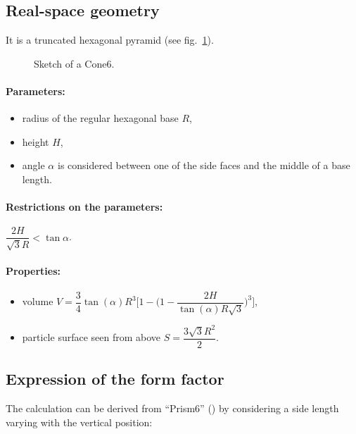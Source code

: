 \subsection{Real-space geometry}
It is a truncated hexagonal pyramid (see fig.~\ref{cone6}). 

\begin{figure}[ht]
\begin{center}
\caption{Sketch of a Cone6.}
\end{center}
\label{cone6}
\end{figure}

\paragraph{Parameters:}
\begin{itemize}
\item radius of the regular hexagonal base $R$,
\item height $H$,
\item angle $\alpha$ is considered between one of the side faces and
  the middle of a base length. 
\end{itemize}

\paragraph{Restrictions on the parameters:} $\dfrac{2H}{\sqrt{3}R}< \tan{\alpha}$.

\paragraph{Properties:}
\begin{itemize}
\item volume $V = \dfrac{3}{4} \tan(\alpha) R^3 \Big[
            1 - \big(1- \dfrac{2H}{ \tan(\alpha) R\sqrt{3}}\big)^3
            \Big]$,
\item  particle surface seen from above $S =\dfrac{3\sqrt{3}R^2}{2}$.
\end{itemize}

\subsection{Expression of the form factor}
The
calculation can be derived from ``Prism6'' () by
considering a side length varying with the vertical position:

